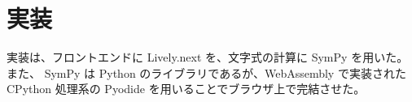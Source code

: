 \chapter{実装} \label{implementation}

実装は、フロントエンドに Lively.next\cite{Lively.next} を、文字式の計算に SymPy\cite{SymPy} を用いた。また、 SymPy は Python のライブラリであるが、WebAssembly で実装された CPython 処理系の Pyodide\cite{Pyodide} を用いることでブラウザ上で完結させた。
